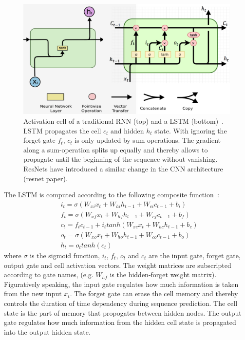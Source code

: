 \begin{figure}
	\centering
	\includegraphics [trim=0 0 0 0, clip, angle=0, width=1.0\columnwidth,
	keepaspectratio]{figures/rnn_lstm}
	\caption{Activation cell of a traditional RNN (top) and a LSTM (bottom)~\cite{colah_lstm}. LSTM propagates the cell $c_t$ and hidden $h_t$ state. With ignoring the forget gate $f_t$, $c_t$ is only updated by sum operations. The gradient along a sum-operation splits up equally and thereby allows to propagate until the beginning of the sequence without vanishing. ResNets have introduced a similar change in the CNN architecture (resnet paper).} 
	\label{fig:rnn_lstm} 
\end{figure}

The LSTM is computed according to the following composite function~\cite{DBLP:journals/corr/Graves13}:
\begin{equation}
\begin{aligned}
& i_t = \sigma(W_{xi}x_t + W_{hi}h_{t-1} + W_{ci}c_{t-1} + b_i)\\
& f_t = \sigma(W_{xf}x_t + W_{hf}h_{t-1} + W_{cf}c_{t-1} + b_f)\\
& c_t = f_tc_{t-1} + i_ttanh(W_{xc}x_t + W_{hc}h_{t-1} + b_c)\\
& o_t = \sigma(W_{xo}x_t + W_{ho}h_{t-1} + W_{co}c_{t-1} + b_o)\\
& h_t = o_ttanh(c_t)
\end{aligned}
\label{eq:lstm_eq} 
\end{equation}
where $\sigma$ is the sigmoid function, $i_t$, $f_t$, $o_t$ and $c_t$ are the input gate, forget gate, output gate and cell activation vectors.
The weight matrices are subscripted according to gate names, (e.g. $W_{hf}$ is the hidden-forget weight matrix).
Figuratively speaking, the input gate regulates how much information is taken from the new input $x_t$.
The forget gate can erase the cell memory and thereby controls the duration of time dependency during sequence prediction.
The cell state is the part of memory that propogates between hidden nodes.
The output gate regulates how much information from the hidden cell state is propagated into the output hidden state.

